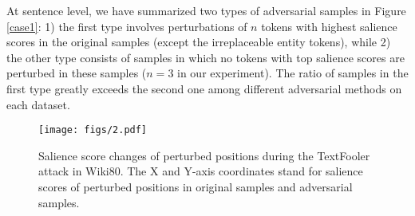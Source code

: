 \documentclass[sigconf]{acmart}
\begin{document}
\begin{table}[h]
   \centering 
{}
\caption{Adversarial attack results from Wiki80 and TACRED dataset. The first two rows show numbers of correctly predicted samples and test performance (accuracy for Wiki80 and micro F1 for TACRED) of BERT or MTB model on two datasets, and the following rows indicate numbers of adversarial samples generated / success rate of adversarial attack with each (model, adversarial method) pair on each dataset.}
  \label{adv_res}
\end{table}
At sentence level, we have summarized two types of adversarial samples in Figure \ref{case1}: 1) the first type involves perturbations of $n$ tokens with highest salience scores in the original samples (except the irreplaceable entity tokens), while 2) the other type consists of samples in which no tokens with top salience scores are perturbed in these samples ($n=3$ in our experiment).
The ratio of samples in the first type greatly exceeds the second one among different adversarial methods on each dataset.
\begin{figure}[h] \centering
  \texttt{[image: figs/2.pdf]}
\caption{Salience score changes of perturbed positions during the TextFooler attack in Wiki80. The X and Y-axis coordinates stand for salience scores of perturbed positions in original samples and adversarial samples.}
\label{normal_adv}
\end{figure}
\end{document}
